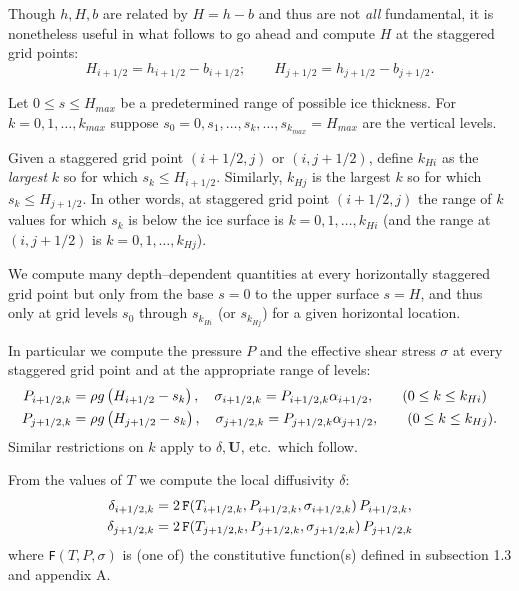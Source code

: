 \documentclass[12pt,final]{amsart}%
\theoremstyle{plain}
\theoremstyle{definition}
\theoremstyle{remark}
\newcommand{\mtt}{\texttt}
\newcommand{\bU}{{\mathbf{U}}}
\begin{document}
Though $h,H,b$ are related by $H=h-b$ and thus are not \emph{all} fundamental, it is nonetheless useful in what follows to go ahead and compute $H$ at the staggered grid points:
\begin{equation}
    H_{i+1/2}=h_{i+1/2}-b_{i+1/2}; \qquad H_{j+1/2}=h_{j+1/2}-b_{j+1/2}.
\end{equation}

Let $0\le s \le H_{max}$ be a predetermined range of possible ice thickness.  For $k=0,1,\dots,k_{max}$ suppose $s_0=0,s_1 ,\dots,s_k,\dots,s_{k_{max}}=H_{max}$ are the vertical levels.

Given a staggered grid point $(i+1/2,j)$ or $(i,j+1/2)$, define $k_{Hi}$ as the \emph{largest} $k$ so for which $s_k\le H_{i+1/2}$.  Similarly, $k_{Hj}$ is the largest $k$ so for which $s_k\le H_{j+1/2}$.  In other words, at staggered grid point $(i+1/2,j)$ the range of $k$ values for which $s_k$ is below the ice surface is $k=0,1,\dots,k_{Hi}$ (and the range at $(i,j+1/2)$ is $k=0,1,\dots,k_{Hj}$).

We compute many depth--dependent quantities at every horizontally staggered grid point but only from the base $s=0$ to the upper surface $s=H$, and thus only at grid levels $s_0$ through $s_{k_{Hi}}$ (or $s_{k_{Hj}}$) for a given horizontal location.

In particular we compute the pressure $P$ and the effective shear stress $\sigma$ at every staggered grid point and at the appropriate range of levels:
\begin{align}
  P_{i+1/2,k}&=\rho g \left(H_{i+1/2}-s_k\right), \quad \sigma_{i+1/2,k}=P_{i+1/2,k} \alpha_{i+1/2}, \qquad (0\le k \le k_{Hi}) \\
  P_{j+1/2,k}&=\rho g \left(H_{j+1/2}-s_k\right), \quad \sigma_{j+1/2,k}=P_{j+1/2,k} \alpha_{j+1/2}, \qquad (0\le k \le k_{Hj}).\notag
\end{align}
Similar restrictions on $k$ apply to $\delta,\bU$, etc.~which follow.

From the values of $T$ we compute the local diffusivity $\delta$:
\begin{align}
\delta_{i+1/2,k}&=2 \,\mtt{F}(T_{i+1/2,k},P_{i+1/2,k}, \sigma_{i+1/2,k})\,P_{i+1/2,k}, \\
\delta_{j+1/2,k}&=2 \,\mtt{F}(T_{j+1/2,k},P_{j+1/2,k}, \sigma_{j+1/2,k})\,P_{j+1/2,k}\notag
\end{align}
where \mtt{F}$(T,P,\sigma)$ is (one of) the constitutive function(s) defined in subsection 1.3 and appendix A.
\end{document}
